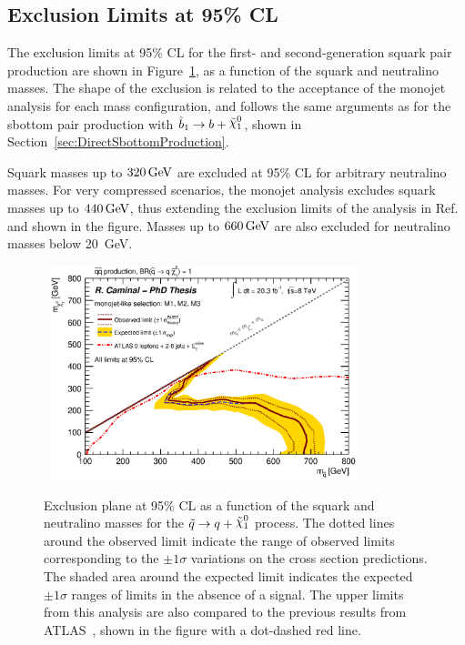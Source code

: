 \subsection{Exclusion Limits at 95\% CL}

The exclusion limits at 95\% CL for the first- and second-generation squark pair production are shown in Figure~\ref{fig:ExclusionSquarktoq}, as a function of the squark and neutralino masses.
The shape of the exclusion is related to the acceptance of the monojet analysis for each mass configuration, and follows the same arguments as for the sbottom pair production with $\sbottomtob$, shown in Section~\ref{sec:DirectSbottomProduction}.

Squark masses up to $\unit[320]{GeV}$ are excluded at 95\% CL for arbitrary neutralino masses.
For very compressed scenarios, the monojet analysis excludes squark masses up to $\unit[440]{GeV}$, thus extending the exclusion limits of the analysis in Ref.~\cite{Aad:2014wea} and shown in the figure.
Masses up to $\unit[660]{GeV}$ are also excluded for neutralino masses below 20~GeV.


\begin{figure}[!t]
  \begin{center}
    \mbox{
      \includegraphics[width=0.795\textwidth]{Interpretations/Figures/limitPlotSquark_Stop_combined_M1_M2_M3_.eps}
    }
  \end{center}
  \caption[Exclusion plane at 95\% CL for sbottom pair production with $\squarktoq$ as a function of the $m_{\squark}$ and $m_{\ninoone}$]{Exclusion plane at 95\% CL as a function of the squark and neutralino masses for the $\squarktoq$ process. The dotted lines around the observed limit indicate the range of observed limits corresponding to the $\pm 1 \sigma$ variations on the cross section predictions. The shaded area around the expected limit indicates the expected $\pm 1 \sigma$ ranges of limits in the absence of a signal.
  The upper limits from this analysis are also compared to the previous results from ATLAS~\cite{Aad:2014wea}, shown in the figure with a dot-dashed red line.}
  \label{fig:ExclusionSquarktoq}
\end{figure}


